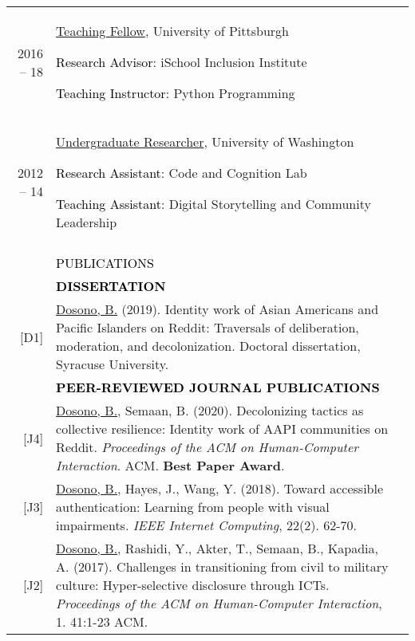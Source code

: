 \documentclass[11pt]{article}
\begin{document}
{{\begin{longtable}{Rp{0.75in}p{5.0in}}
\footnotesize{2016 -- 18} & \href{http://www.sis.pitt.edu/i3/phd-fellows/fellow-profiles.html}{Teaching Fellow}, University of Pittsburgh \par \textcolor{black}{Research Advisor}: iSchool Inclusion Institute \par \textcolor{black}{Teaching Instructor}: Python Programming\\

\footnotesize{2012 -- 14} & \href{https://faculty.washington.edu/ajko/lab}{Undergraduate Researcher}, University of Washington \par \textcolor{black}{Research Assistant}: Code and Cognition Lab \par \textcolor{black}{Teaching Assistant}: Digital Storytelling and Community Leadership\\
\\

\sout{\hfill} 
& \par \Large \textcolor{black}{\uppercase{Publications\hspace{6pt} \sout{\hfill}}}\\

& \textcolor{black}{\uppercase{\textbf{Dissertation}}}\\

\footnotesize{[D1]} & \href{https://surface.syr.edu/etd/1034/}{Dosono, B.} (2019). Identity work of Asian Americans and Pacific Islanders on Reddit: Traversals of deliberation, moderation, and decolonization. Doctoral dissertation, Syracuse University.\\

& \textcolor{black}{\uppercase{\textbf{Peer-reviewed Journal Publications}}}\\

\footnotesize{[J4]} & \href{https://dl.acm.org/doi/10.1145/3392881?cid=88158835957}{Dosono, B.}, Semaan, B. (2020). Decolonizing tactics as collective resilience: Identity work of AAPI communities on Reddit. \textit{Proceedings of the ACM on Human-Computer Interaction}. ACM. \textbf{Best Paper Award}.\\

\footnotesize{[J3]} & \href{https://doi.org/10.1109/MIC.2018.112101619}{Dosono, B.}, Hayes, J., Wang, Y. (2018). Toward accessible authentication: Learning from people with visual impairments. \textit{IEEE Internet Computing}, 22(2). 62-70.\\

\footnotesize{[J2]} & \href{https://dl.acm.org/authorize?N42807}{Dosono, B.}, Rashidi, Y., Akter, T., Semaan, B., Kapadia, A. (2017). Challenges in transitioning from civil to military culture: Hyper-selective disclosure through ICTs. \textit{Proceedings of the ACM on Human-Computer Interaction}, 1. 41:1-23 ACM.\\


\end{longtable}}}
\end{document}
